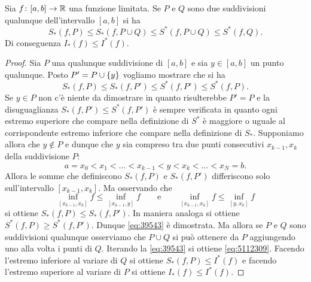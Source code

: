 \begin{lemma}
Sia $f\colon[a,b]\to \mathbb R$ una funzione limitata.
Se $P$ e $Q$ sono due suddivisioni qualunque dell'intervallo
$[a,b]$ si ha
\begin{equation}\label{eq:5112309}
  S_*(f,P) \le S_*(f,P\cup Q)\le S^*(f,P\cup Q) \le S^*(f,Q).
\end{equation}
Di conseguenza $I_*(f) \le I^*(f)$.
\end{lemma}
\begin{proof}
  Sia $P$ una qualunque suddivisione di $[a,b]$ e sia $y\in [a,b]$ un punto qualunque. Posto $P' = P \cup {\left\{ y \right\}}$ vogliamo mostrare
  che si ha
  \begin{equation}\label{eq:39543}
    S_*(f,P) \le S_*(f,P') \le S^*(f,P') \le S^*(f,P).
  \end{equation}
  Se $y\in P$ non c'è niente da dimostrare in quanto
  risulterebbe $P'=P$ e la disuguaglianza $S_*(f,P') \le S^*(f,P')$ è sempre verificata in quanto ogni estremo superiore che compare nella definizione di $S^*$ è maggiore o uguale al corrispondente
  estremo inferiore che compare nella definizione di $S_*$.
  Supponiamo allora che $y \not \in P$ e dunque che $y$ sia compreso tra due punti consecutivi $x_{k-1}, x_k$ della suddivisione $P$:
  \[
    a= x_0 < x_1 < \dots < x_{k-1} < y < x_k < \dots < x_N=b.
  \]
  Allora le somme che definiscono $S_*(f,P)$ e $S_*(f,P')$ 
  differiscono solo sull'intervallo $[x_{k-1},x_k]$. 
  Ma osservando che
  \[
  \inf_{[x_{k-1}, x_k]}\!\!f
  \le\inf_{[x_{k-1},y]}\!\! f
  \qquad \text{e} \qquad
  \inf_{[x_{k-1}, x_k]}\!\!f
  \le\inf_{[y,x_k]}\!\! f
  \]
  si ottiene $S_*(f,P) \le S_*(f,P')$.
  In maniera analoga si ottiene $S^*(f,P) \ge S^*(f,P')$.
  Dunque \eqref{eq:39543} è dimostrata.
  Ma allora se $P$ e $Q$ sono suddivisioni qualunque osserviamo che $P\cup Q$ 
  si può ottenere da $P$ aggiungendo uno alla volta i punti di $Q$. 
  Iterando la \eqref{eq:39543} si ottiene \eqref{eq:5112309}.
  Facendo l'estremo inferiore al variare di $Q$
  si ottiene $S_*(f,P) \le I^*(f)$ e facendo l'estremo superiore al variare 
  di $P$ si ottiene $I_*(f) \le I^*(f)$.
  \end{proof}

